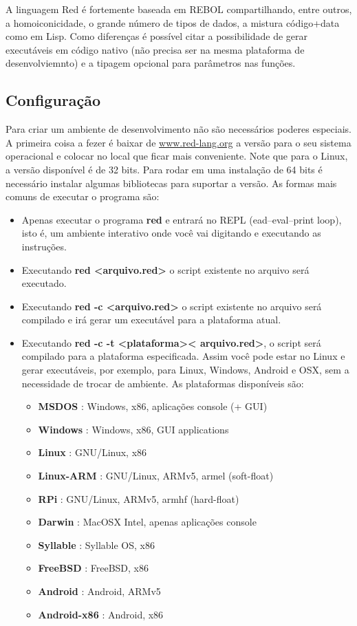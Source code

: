 \documentclass[12pt]{article}
\begin{document}
A linguagem Red é fortemente baseada em REBOL compartilhando, entre outros, a
homoiconicidade, o grande número de tipos de dados, a mistura código+data como
em Lisp. Como diferenças é possível citar a possibilidade de gerar executáveis
em código nativo (não precisa ser na mesma plataforma de desenvolviemnto) e a
tipagem opcional para parâmetros nas funções.

\subsection{Configuração}

Para criar um ambiente de desenvolvimento não são necessários poderes especiais.
A primeira coisa a fezer é baixar de 
\href{http://www.red-lang.org/p/download.html}{www.red-lang.org} a versão para o
seu sistema operacional e colocar no local que ficar mais conveniente. Note que
para o Linux, a versão disponível é de 32 bits. Para rodar em uma instalação de
64 bits é necessário instalar algumas bibliotecas para suportar a versão. As
formas mais comuns de executar o programa são:

\begin{itemize}
\item Apenas executar o programa \textbf{red} e entrará no REPL (ead–eval–print loop),
  isto é, um ambiente interativo onde você vai digitando e executando as
  instruções.
\item Executando \textbf{red \textless arquivo.red\textgreater} o script
  existente no arquivo será executado.
\item Executando \textbf{red -c \textless arquivo.red\textgreater} o script
  existente no arquivo será compilado e irá gerar um executável para a
  plataforma atual.
\item Executando \textbf{red -c -t \textless plataforma\textgreater \textless
    arquivo.red\textgreater}, o script será compilado para a plataforma
  especificada. Assim você pode estar no Linux e gerar executáveis, por exemplo,
  para Linux, Windows, Android e OSX, sem a necessidade de trocar de ambiente.
  As plataformas disponíveis são:
  \begin{itemize}
  \item \textbf{MSDOS} : Windows, x86, aplicações console (+ GUI)
  \item \textbf{Windows} : Windows, x86, GUI applications
  \item \textbf{Linux} : GNU/Linux, x86
  \item \textbf{Linux-ARM} : GNU/Linux, ARMv5, armel (soft-float)
  \item \textbf{RPi} : GNU/Linux, ARMv5, armhf (hard-float)
  \item \textbf{Darwin} : MacOSX Intel, apenas aplicações console
  \item \textbf{Syllable} : Syllable OS, x86
  \item \textbf{FreeBSD} : FreeBSD, x86
  \item \textbf{Android} : Android, ARMv5
  \item \textbf{Android-x86} : Android, x86
  \end{itemize}

\end{itemize}
\end{document}
